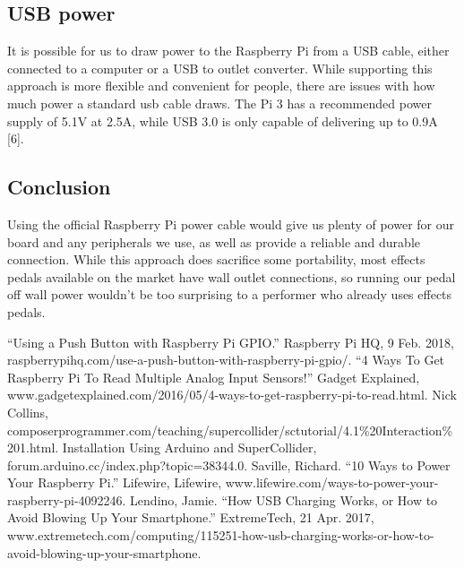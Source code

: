 \documentclass{article}
\begin{document}
\subsection{USB power}
It is possible for us to draw power to the Raspberry Pi from a USB cable, either connected to a computer or a USB to outlet converter. While supporting this approach is more flexible and convenient for people, there are issues with how much power a standard usb cable draws. The Pi 3 has a recommended power supply of 5.1V at 2.5A, while USB 3.0 is only capable of delivering up to 0.9A [6].  

\subsection{Conclusion}
Using the official Raspberry Pi power cable would give us plenty of power for our board and any peripherals we use, as well as provide a reliable and durable connection. While this approach does sacrifice some portability, most effects pedals available on the market have wall outlet connections, so running our pedal off wall power wouldn't be too surprising to a performer who already uses effects pedals.


\begin{thebibliography}{00}
“Using a Push Button with Raspberry Pi GPIO.” Raspberry Pi HQ, 9 Feb. 2018, raspberrypihq.com/use-a-push-button-with-raspberry-pi-gpio/.
“4 Ways To Get Raspberry Pi To Read Multiple Analog Input Sensors!” Gadget Explained, www.gadgetexplained.com/2016/05/4-ways-to-get-raspberry-pi-to-read.html.
Nick Collins, composerprogrammer.com/teaching/supercollider/sctutorial/4.1\%20Interaction\%201.html.
Installation Using Arduino and SuperCollider, forum.arduino.cc/index.php?topic=38344.0.
Saville, Richard. “10 Ways to Power Your Raspberry Pi.” Lifewire, Lifewire, www.lifewire.com/ways-to-power-your-raspberry-pi-4092246.
Lendino, Jamie. “How USB Charging Works, or How to Avoid Blowing Up Your Smartphone.” ExtremeTech, 21 Apr. 2017, www.extremetech.com/computing/115251-how-usb-charging-works-or-how-to-avoid-blowing-up-your-smartphone.

\end{thebibliography}
\end{document}
